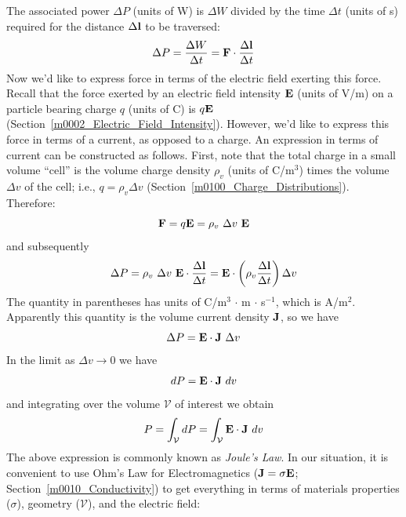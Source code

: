 The associated power $\Delta P$ (units of W) is $\Delta W$ divided by the time $\Delta t$ (units of s) required for the distance $\Delta{\bf l}$ to be traversed:
%
\begin{equation}
\Delta P = \frac{\Delta W}{\Delta t} = {\bf F}\cdot \frac{\Delta {\bf l}}{\Delta t}
\end{equation}
%
Now we'd like to express force in terms of the electric field exerting this force.
Recall that the force exerted by an electric field intensity ${\bf E}$ (units of V/m) on a particle bearing charge $q$ (units of C) is $q{\bf E}$ (Section~\ref{m0002_Electric_Field_Intensity}).
However, we'd like to express this force in terms of a current, as opposed to a charge.
An expression in terms of current can be constructed as follows. 
First, note that the total charge in a small volume ``cell'' is the volume charge density $\rho_v$ (units of C/m$^3$) times the volume  $\Delta v$ of the cell; i.e., $q = \rho_v \Delta v$ (Section~\ref{m0100_Charge_Distributions}). Therefore: 
%
\begin{equation}
{\bf F} = q{\bf E} = \rho_v~\Delta v~{\bf E}
\end{equation} 
%
and subsequently 
%
\begin{equation}
\Delta P = \rho_v~\Delta v~{\bf E} \cdot \frac{\Delta {\bf l}}{\Delta t} 
         = {\bf E} \cdot \left( \rho_v \frac{\Delta {\bf l}}{\Delta t} \right) \Delta v
\end{equation}
%
The quantity in parentheses has units of C/m$^3$ $\cdot$ m $\cdot$ s$^{-1}$, which is A/m$^2$.
Apparently this quantity is the volume current density ${\bf J}$, so we have  
%
\begin{equation}
\Delta P = {\bf E} \cdot {\bf J}~\Delta v
\end{equation}
%
In the limit as $\Delta v\to 0$ we have
%
\begin{equation}
dP = {\bf E} \cdot {\bf J}~dv
\end{equation}
%
and integrating over the volume ${\mathcal V}$ of interest we obtain
%
\begin{equation}
P = \int_{\mathcal V} dP = \int_{\mathcal V} {\bf E} \cdot {\bf J}~dv
\label{m0106_eJLx}
\end{equation}
%
The above expression is commonly known as \emph{Joule's Law}.
In our situation, it is convenient to use Ohm's Law 
for Electromagnetics (${\bf J}=\sigma{\bf E}$; Section~\ref{m0010_Conductivity}) to get everything in terms of materials properties ($\sigma$), geometry (${\mathcal V}$), and the electric field:
